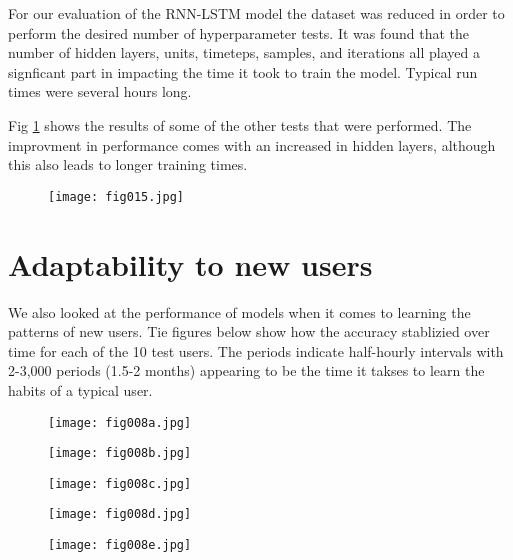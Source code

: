 For our evaluation of the RNN-LSTM model the dataset was reduced in order to perform the desired number of hyperparameter tests. It was found that the number of hidden layers, units, timeteps, samples, and iterations all played a signficant part in impacting the time it took to train the model. Typical run times were several hours long. 

Fig \ref{fig15} shows the results of some of the other tests that were performed. The improvment in performance comes with an increased in hidden layers, although this also leads to longer training times.

\begin{figure}[h!]
	\centering
	\texttt{[image: fig015.jpg]}
	\caption{}
	\label{fig15}
\end{figure}

\section{Adaptability to new users}

We also looked at the performance of models when it comes to learning the patterns of new users. Tie figures below show how the accuracy stablizied over time for each of the 10 test users. The periods indicate half-hourly intervals with 2-3,000 periods (1.5-2 months) appearing to be the time it takses to learn the habits of a typical user. 
\begin{figure}[h!]
	\centering
	\texttt{[image: fig008a.jpg]}
	\caption{}
	\label{fig:fig8a}
\end{figure} 

\begin{figure}[h!]
	\centering
	\texttt{[image: fig008b.jpg]}
	\caption{}
	\label{fig:fig8b}
\end{figure} 

\begin{figure}[h!]
	\centering
	\texttt{[image: fig008c.jpg]}
	\caption{}
	\label{fig:fig8c}
\end{figure} 

\begin{figure}[h!]
	\centering
	\texttt{[image: fig008d.jpg]}
	\caption{}
	\label{fig:fig8d}
\end{figure} 

\begin{figure}[h!]
	\centering
	\texttt{[image: fig008e.jpg]}
	\caption{}
	\label{fig:fig8e}
\end{figure} 


